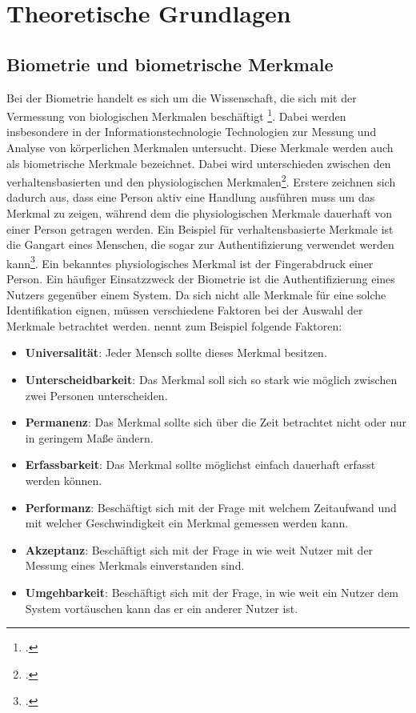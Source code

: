 \section{Theoretische Grundlagen}
\subsection{Biometrie und biometrische Merkmale}
\label{section:Biometrie}
Bei der Biometrie handelt es sich um die Wissenschaft, die sich mit der Vermessung von biologischen Merkmalen beschäftigt \footcite[Vgl.][]{Sea18}. Dabei werden insbesondere in der Informationstechnologie Technologien zur Messung und Analyse von körperlichen Merkmalen untersucht.\newline
Diese Merkmale werden auch als biometrische Merkmale bezeichnet. Dabei wird unterschieden zwischen den verhaltensbasierten und den physiologischen Merkmalen\footcite[Vgl. ][]{Sas06}. Erstere zeichnen sich dadurch aus, dass eine Person aktiv eine Handlung ausführen muss um das Merkmal zu zeigen, während dem die physiologischen Merkmale dauerhaft von einer Person getragen werden. Ein Beispiel für verhaltensbasierte Merkmale ist die Gangart eines Menschen, die sogar zur Authentifizierung verwendet werden kann\footcite[Vgl. ][]{Cla09}. Ein bekanntes physiologisches Merkmal ist der Fingerabdruck einer Person.\newline
Ein häufiger Einsatzzweck der Biometrie ist die Authentifizierung eines Nutzers gegenüber einem System. Da sich nicht alle Merkmale für eine solche Identifikation eignen, müssen verschiedene Faktoren bei der Auswahl der Merkmale betrachtet werden. \cite{Akj04} nennt zum Beispiel folgende Faktoren: 
\begin{itemize}
	\item \textbf{Universalität}: Jeder Mensch sollte dieses Merkmal besitzen.
	\item \textbf{Unterscheidbarkeit}: Das Merkmal soll sich so stark wie möglich zwischen zwei Personen unterscheiden.
	\item \textbf{Permanenz}: Das Merkmal sollte sich über die Zeit betrachtet nicht oder nur in geringem Maße ändern.
	\item \textbf{Erfassbarkeit}: Das Merkmal sollte möglichst einfach dauerhaft erfasst werden können.
	\item \textbf{Performanz}: Beschäftigt sich mit der Frage mit welchem Zeitaufwand und mit welcher Geschwindigkeit ein Merkmal gemessen werden kann. 
	\item \textbf{Akzeptanz}: Beschäftigt sich mit der Frage in wie weit Nutzer mit der Messung eines Merkmals einverstanden sind. 
	\item \textbf{Umgehbarkeit}: Beschäftigt sich mit der Frage, in wie weit ein Nutzer dem System vortäuschen kann das er ein anderer Nutzer ist.
\end{itemize}
